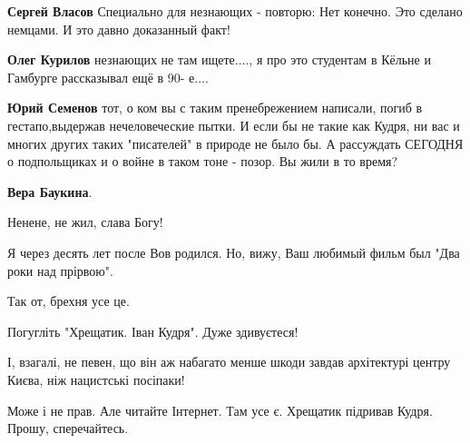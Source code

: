 \begin{itemize}
\begin{itemize}
\begin{itemize}
\textbf{Сергей Власов} Специально для незнающих - повторю: Нет конечно. Это сделано немцами. И это давно доказанный факт!


 
\textbf{Олег Курилов} незнающих не там ищете...., я про это студентам в Кёльне и Гамбурге рассказывал ещё в 90- е....
\end{itemize}

 
\textbf{Юрий Семенов} тот, о ком вы с таким пренебрежением написали, погиб в
гестапо,выдержав нечеловеческие пытки. И если бы не такие как Кудря, ни вас и
многих других таких "писателей" в природе не было бы. А рассуждать СЕГОДНЯ о
подпольщиках и о войне в таком тоне - позор. Вы жили в то время?

\begin{itemize}
 
\textbf{Вера Баукина}. 

Ненене, не жил, слава Богу!

Я через десять лет после Вов родился. Но, вижу, Ваш любимый фильм был "Два роки
над прірвою".

Так от, брехня усе це.

Погугліть "Хрещатик. Іван Кудря". Дуже здивуєтеся!

І, взагалі, не певен, що він аж набагато менше шкоди завдав архітектурі центру
Києва, ніж нацистські посіпаки!

Може і не прав. Але читайте Інтернет. Там усе є. Хрещатик підривав Кудря.
Прошу, сперечайтесь.


 

\end{itemize}
\end{itemize}
\end{itemize}
